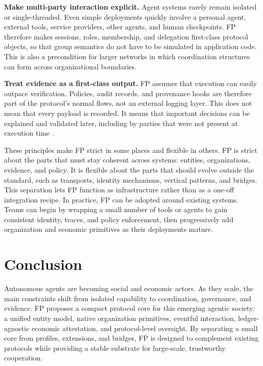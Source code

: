 \documentclass{foundationpaper}
\begin{document}
\textbf{Make multi-party interaction explicit.} Agent systems rarely remain isolated or single-threaded. Even simple deployments quickly involve a personal agent, external tools, service providers, other agents, and human checkpoints. FP therefore makes sessions, roles, membership, and delegation first-class protocol objects, so that group semantics do not have to be simulated in application code. This is also a precondition for larger networks in which coordination structures can form across organizational boundaries.

\textbf{Treat evidence as a first-class output.} FP assumes that execution can easily outpace verification. Policies, audit records, and provenance hooks are therefore part of the protocol's normal flows, not an external logging layer. This does not mean that every payload is recorded. It means that important decisions can be explained and validated later, including by parties that were not present at execution time \cite{agi_economics}.

These principles make FP strict in some places and flexible in others. FP is strict about the parts that must stay coherent across systems: entities, organizations, evidence, and policy. It is flexible about the parts that should evolve outside the standard, such as transports, identity mechanisms, vertical patterns, and bridges. This separation lets FP function as infrastructure rather than as a one-off integration recipe.
In practice, FP can be adopted around existing systems. Teams can begin by wrapping a small number of tools or agents to gain consistent identity, traces, and policy enforcement, then progressively add organization and economic primitives as their deployments mature.





\section{Conclusion}
\label{sec:conclusion}

Autonomous agents are becoming social and economic actors. As they scale, the main constraints shift from isolated capability to coordination, governance, and evidence. FP proposes a compact protocol core for this emerging agentic society: a unified entity model, native organization primitives, eventful interaction, ledger-agnostic economic attestation, and protocol-level oversight. By separating a small core from profiles, extensions, and bridges, FP is designed to complement existing protocols while providing a stable substrate for large-scale, trustworthy cooperation.
\end{document}
